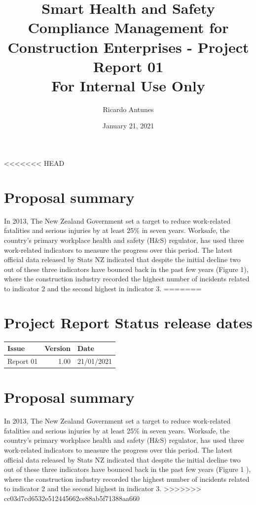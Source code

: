 \documentclass{article}
\author{Ricardo Antunes}
\date{January 21, 2021}
\title{Smart Health and Safety Compliance Management for Construction Enterprises - Project Report 01\\\medskip
\large For Internal Use Only}
\begin{document}
\maketitle
\tableofcontents


<<<<<<< HEAD

\section{Proposal summary}
\label{sec:orgd3b407d}

In 2013, The New Zealand Government set a target to reduce work-related fatalities and serious injuries by at least 25\% in seven years. Worksafe, the country's primary workplace health and safety (H\&S) regulator, has used three work-related indicators to measure the progress over this period. The latest official data released by Stats NZ indicated that despite the initial decline two out of these three indicators have bounced back in the past few years (Figure 1), where the construction industry recorded the highest number of incidents related to indicator 2 and the second highest in indicator 3.  
=======
\section{Project Report Status release dates}
\label{sec:org76690ab}
\begin{center}
\begin{tabular}{lrl}
Issue & Version & Date\\
\hline
Report 01 & 1.00 & 21/01/2021\\
\end{tabular}
\end{center}
\section{Proposal summary}
\label{sec:orgca8b77c}

In 2013, The New Zealand Government set a target to reduce work-related fatalities and serious injuries by at least 25\% in seven years. 
Worksafe, the country's primary workplace health and safety (H\&S) regulator, has used three work-related indicators to measure the progress over this period. 
The latest official data released by Stats NZ indicated that despite the initial decline two out of these three indicators have bounced back in the past few years (Figure 1 \label{org397b92c}), where the construction industry recorded the highest number of incidents related to indicator 2 and the second highest in indicator 3.  
>>>>>>> cc03d7cd6532e512445662ce88ab5f71388aa660
\end{document}
